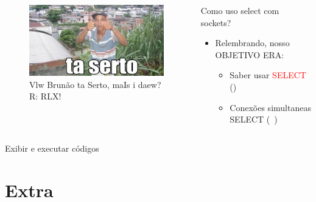 \documentclass[10pt, xcolor=x11names]{beamer}
\begin{document}
\begin{frame}
	\begin{columns}
			\begin{figure}
				\includegraphics[width=.8\linewidth]{img/taserto.png}
				\caption{Vlw Brunão ta Serto, maIs i daew? \\ R: RLX!}
			\end{figure}
		

		\begin{block}{Como uso select com sockets?}
			\begin{itemize}
				\item Relembrando, nosso OBJETIVO ERA:
					\begin{itemize}
						\item Saber usar \textcolor{red}{SELECT} (\checkmark)
						\item Conexões simultaneas SELECT (~)
					\end{itemize}
			\end{itemize}
		\end{block}
		
	\end{columns}
\end{frame}


\begin{frame}
	\centering
 	\Huge
	Exibir e executar códigos
\end{frame}


\section{Extra} %
\end{document}
